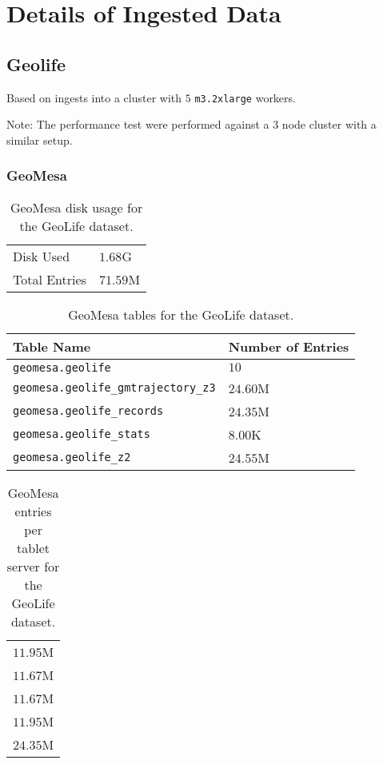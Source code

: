 \section{Details of Ingested Data}
\label{appendix:data}

\subsection{Geolife}

Based on ingests into a cluster with $5$ \texttt{m3.2xlarge} workers.

Note: The performance test were performed against a $3$ node cluster with a similar setup.

\subsubsection{GeoMesa}

\begin{table}[htb]
  \centering
  \begin{tabular}{ | l | l | }
    \hline
    Disk Used & $1.68$G \\
    Total Entries & $71.59$M \\
    \hline
  \end{tabular}
  \caption{GeoMesa disk usage for the GeoLife dataset.}
  \label{table:geolife:geomesa:disk}
\end{table}

\begin{table}[htb]
  \centering
  \begin{tabular}{ | l | l | }
    \hline
    Table Name & Number of Entries \\ \hline
    \texttt{geomesa.geolife} & $10$ \\
    \texttt{geomesa.geolife\_gmtrajectory\_z3} & $24.60$M \\
    \texttt{geomesa.geolife\_records} & $24.35$M \\
    \texttt{geomesa.geolife\_stats} & $8.00$K \\
    \texttt{geomesa.geolife\_z2} & $24.55$M \\
    \hline
  \end{tabular}
  \caption{GeoMesa tables for the GeoLife dataset.}
  \label{table:geolife:geomesa:tables}
\end{table}

\begin{table}[htb]
  \centering
  \begin{tabular}{ | r | }
    \hline
    $11.95$M \\
    $11.67$M \\
    $11.67$M \\
    $11.95$M \\
    $24.35$M \\
    \hline
  \end{tabular}
  \caption{GeoMesa entries per tablet server for the GeoLife dataset.}
  \label{table:geolife:geomesa:tablets}
\end{table}

